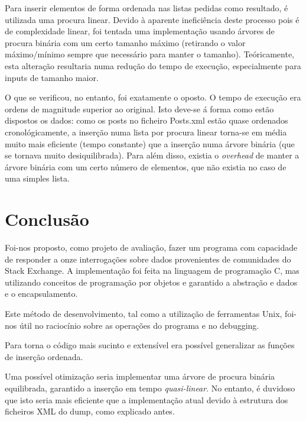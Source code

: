 \documentclass[10pt]{report}
\begin{document}
Para inserir elementos de forma ordenada nas listas pedidas como resultado, é utilizada uma procura linear. Devido à aparente ineficiência deste processo pois é de complexidade linear, foi tentada uma implementação usando árvores de procura binária com um certo tamanho máximo (retirando o valor máximo/mínimo sempre que necessário para manter o tamanho). Teóricamente, esta alteração resultaria numa redução do tempo de execução, especialmente para inputs de tamanho maior.

O que se verificou, no entanto, foi exatamente o oposto. O tempo de execução era ordens de magnitude superior ao original. Isto deve-se á forma como estão dispostos os dados: como os posts no ficheiro Posts.xml estão quase ordenados cronológicamente, a inserção numa lista por procura linear torna-se em média muito mais eficiente (tempo constante) que a inserção numa árvore binária (que se tornava muito desiquilibrada). Para além disso, existia o \textit{overhead} de manter a árvore binária com um certo número de elementos, que não existia no caso de uma simples lista.

\chapter{Conclusão}

Foi-nos proposto, como projeto de avaliação, fazer um programa com capacidade de responder a onze interrogações sobre dados provenientes de comunidades do Stack Exchange. A implementação foi feita na linguagem de programação C, mas utilizando conceitos de programação por objetos e garantido a abstração e dados e o encapsulamento.

Este método de desenvolvimento, tal como a utilização de ferramentas Unix, foi-nos útil no raciocínio sobre as operações do programa e no debugging.

Para torna o código mais sucinto e extensível era possível generalizar as funções de inserção ordenada.

Uma possível otimização seria implementar uma árvore de procura binária equilibrada, garantido a inserção em tempo \textit{quasi-linear}. No entanto, é duvidoso que isto seria mais eficiente que a implementação atual devido à estrutura dos ficheiros XML do dump, como explicado antes.

\label{sec:conclusao}
\end{document}
